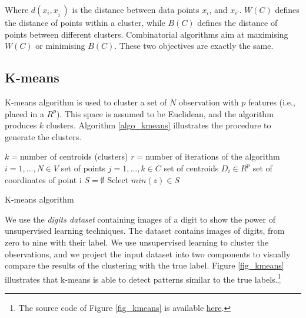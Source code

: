 Where $d(x_i,x_{i^\prime})$ is the distance between data points $x_i$, and $x_{i'}$. $W(C)$ defines the distance of points within a cluster, while $B(C)$ defines the distance of points between different clusters. Combinatorial algorithms aim at maximising $W(C)$ or minimising $B(C)$. These two objectives are exactly the same.


\subsection{K-means} \label{secKmeans}
K-means algorithm is used to cluster a set of $N$ observation with $p$ features (i.e., placed in a $R^p$). This space is assumed to be Euclidean, and the algorithm produces $k$ clusters. Algorithm \ref {algo_kmeans} illustrates the procedure to generate the clusters.

\begin{algorithm}[H]
    \DontPrintSemicolon
    \SetAlgoLined
    $k=$number of centroids (clusters)\;
    $r=$number of iterations of the algorithm\;
    $i=1,...,N \in V$ set of points \;
    $j=1,...,k \in C$ set of centroids \;
    $D_i \in R^p $ set of coordinates of point i \;
    $S= \emptyset $ \;
    Select $min(z) \in S$ \;

\caption{K-means algorithm}
\label{algo_kmeans}    
\end{algorithm}

We use the \textit{digits dataset} containing images of a digit to show the power of unsupervised learning techniques. The dataset contains images of digits, from zero to nine with their label. We use unsupervised learning to cluster the observations, and we project the input dataset into two components to visually compare the results of the clustering with the true label. Figure \ref{fig_kmeans} illustrates that k-means is able to detect patterns similar to the true labels.\footnote{The source code of Figure \ref{fig_kmeans} is available \href{https://github.com/aletuf93/logproj/blob/master/examples/06.\%20Unsupervised\%20learning.ipynb}{here}.
}

